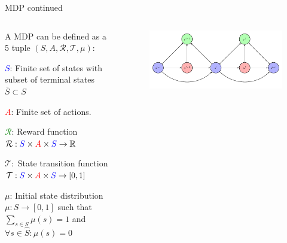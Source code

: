 \begin{frame}{MDP continued}

  \begin{columns} %

    \begin{column}{0.5\textwidth}
     A MDP can be defined as a 5 tuple $(S, A, \mathcal{R}, \mathcal{T}, \mu):$
      \blist
        \item \textcolor{blue}{$S$}: Finite set of states with subset of terminal states $\bar{S} \subset S$
        \item \textcolor{red}{$A$}: Finite set of actions. 
        \item \textcolor{green}{$\mathcal{R}$}: Reward function $\mathcal{R}: \textcolor{blue}{S} \times \textcolor{red}{A} \times \textcolor{blue}{S} \to \mathbb{R}$
        \item $\mathcal{T}:$ State transition function $\mathcal{T}: \textcolor{blue}{S} \times \textcolor{red}{A} \times \textcolor{blue}{S} \to [0, 1]$
        \item $\mu$: Initial state distribution $\mu: S \to [0,1]$ such that $\sum_{s\in S}\mu (s) = 1$ and $\forall s \in \hat{S}: \mu (s) = 0$
      \elist
    \end{column}

    \begin{column}{0.5\textwidth}
      \begin{figure}
        \includegraphics[width=\linewidth]{figures/1_mdp_diagram.pdf}
      \end{figure}
    \end{column}

  \end{columns}

\end{frame}

